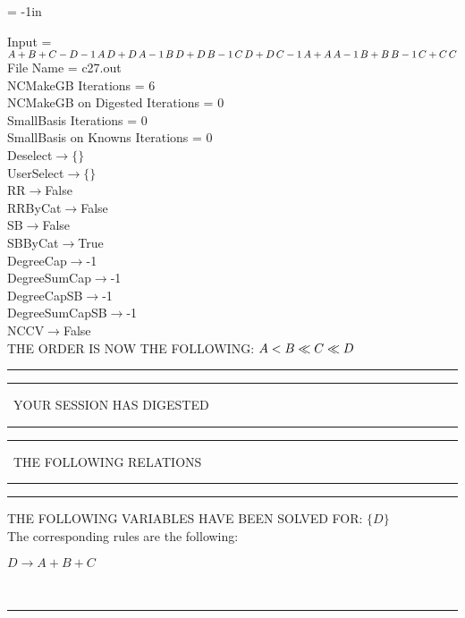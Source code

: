 \voffset = -1in
\evensidemargin 0.1in
\oddsidemargin 0.1in
\textheight 9in
\textwidth 6in

\normalsize
\baselineskip=12pt
\noindent
Input = 
$
\\A + B + C - D\\
-1\,
 A\,
 D + D\,
 A\\
-1\,
 B\,
 D + D\,
 B\\
-1\,
 C\,
 D + D\,
 C\\
-1\,
 A + A\,
 A\\
-1\,
 B + B\,
 B\\
-1\,
 C + C\,
 C\\
$
File Name = c27.out\\
NCMakeGB Iterations = 6\\
NCMakeGB on Digested Iterations = 0\\
SmallBasis Iterations = 0\\
SmallBasis on Knowns Iterations = 0\\
Deselect$\rightarrow \{\}$\\
UserSelect$\rightarrow \{\}$\\
RR$\rightarrow $False\\
RRByCat$\rightarrow $False\\
SB$\rightarrow $False\\
SBByCat$\rightarrow $True\\
DegreeCap$\rightarrow $-1\\
DegreeSumCap$\rightarrow $-1\\
DegreeCapSB$\rightarrow $-1\\
DegreeSumCapSB$\rightarrow $-1\\
NCCV$\rightarrow $False\\
THE ORDER IS NOW THE FOLLOWING:\hfil\break
$
A<B\ll
C\ll
D\\
$
\rule[2pt]{6in}{4pt}\hfil\break
\rule[2pt]{1.879in}{4pt}
\ YOUR SESSION HAS DIGESTED\ 
\rule[2pt]{1.879in}{4pt}\hfil\break
\rule[2pt]{1.923in}{4pt}
\ THE FOLLOWING RELATIONS\ 
\rule[2pt]{1.923in}{4pt}\hfil\break
\rule[2pt]{6in}{4pt}\hfil\break
THE FOLLOWING VARIABLES HAVE BEEN SOLVED FOR:\hfil\break
$\{D\}$
\smallskip\\
The corresponding rules are the following:\smallskip\\
\begin{minipage}{6in}
$
D\rightarrow A + B + C
$
\end{minipage}\medskip\\
\rule[3pt]{6in}{.7pt}\\
